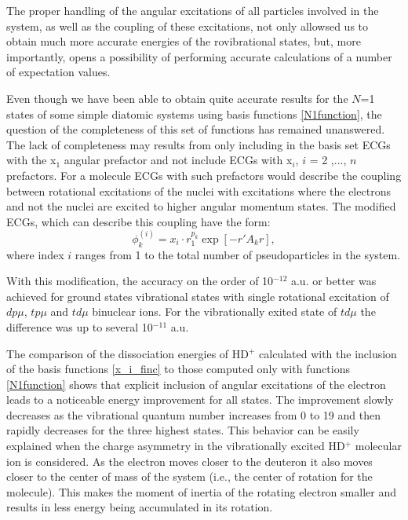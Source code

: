 The proper handling of the angular excitations of all particles involved in the 
system, as well as the coupling of these excitations, not only allowsed us to obtain 
much more accurate energies of the rovibrational states, but, more importantly,
opens a possibility of performing accurate calculations of a number of expectation 
values.

Even though we have been able to obtain quite accurate results for the $N$=1 states 
of some simple diatomic systems using basis functions \ref{N1function}, the question 
of the completeness of this set of functions has remained unanswered. The lack of 
completeness may results from only including in the basis set ECGs with the x$_1$ 
angular prefactor and not include ECGs with x$_i$, $i$ = 2 ,$...$, $n$ prefactors. 
For a molecule ECGs with such prefactors would describe the coupling between rotational 
excitations of the nuclei with excitations where the electrons and not the nuclei 
are excited to higher angular momentum states. The modified ECGs, which can describe 
this coupling have the form:
\begin{equation}
\phi_k^{(i)} = x_i \cdot r_1^{p_k} \exp [-r'A_k r],
\label{x_i_finc}
\end{equation}
where index $i$ ranges from 1 to the total number of pseudoparticles in the system.

With this modification, the accuracy on the order of 10$^{−12}$ a.u. or better was achieved
for ground states vibrational states with single rotational excitation of 
$dp\mu$, $tp\mu$ and $td\mu$ binuclear ions. For the vibrationally exited state 
of $td\mu$ the difference was up to several 10$^{−11}$ a.u.

The comparison of the dissociation energies of HD$^+$ calculated with the
inclusion of the basis functions \ref{x_i_finc} to those computed only with 
functions \ref{N1function} shows that explicit inclusion of angular excitations 
of the electron leads to a noticeable energy improvement for all states.
The improvement slowly decreases as the vibrational quantum number increases 
from 0 to 19 and then rapidly decreases for the three highest states. 
This behavior can be easily explained when the charge asymmetry in the 
vibrationally excited HD$^+$ molecular ion is considered.
As the electron moves closer to the deuteron it also moves closer to the 
center of mass of the system (i.e., the center of rotation for the molecule). 
This makes the moment of inertia of the rotating electron smaller and results 
in less energy being accumulated in its rotation.

